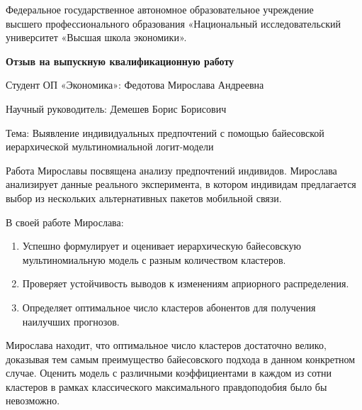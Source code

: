 \documentclass[a4paper, 12pt]{article}
\begin{document}
\begin{center}
{\small Федеральное государственное автономное образовательное учреждение\\ 
высшего профессионального образования «Национальный исследовательский\\ 
университет «Высшая школа экономики».}
\end{center}

\vspace{0.4cm}

\begin{center}
\textbf{Отзыв на выпускную квалификационную работу}
\end{center}

\vspace{0.4cm}

Студент ОП «Экономика»: Федотова Мирослава Андреевна

\vspace{0.4cm}

Научный руководитель: Демешев Борис Борисович

\vspace{0.4cm}

Тема: Выявление индивидуальных предпочтений с помощью байесовской
иерархической мультиномиальной логит-модели

\vspace{1cm}

Работа Мирославы посвящена анализу предпочтений индивидов. Мирослава
анализирует данные реального эксперимента, в котором индивидам
предлагается выбор из нескольких альтернативных пакетов мобильной связи.

В своей работе Мирослава:

\begin{enumerate}
\def\labelenumi{\arabic{enumi}.}
\item
  Успешно формулирует и оценивает иерархическую байесовскую
  мультиномиальную модель с разным количеством кластеров.
\item
  Проверяет устойчивость выводов к изменениям априорного распределения.
\item
  Определяет оптимальное число кластеров абонентов для получения
  наилучших прогнозов.
\end{enumerate}

Мирослава находит, что оптимальное число кластеров достаточно велико,
доказывая тем самым преимущество байесовского подхода в данном
конкретном случае. Оценить модель с различными коэффициентами в каждом
из сотни кластеров в рамках классического максимального правдоподобия
было бы невозможно.
\end{document}
